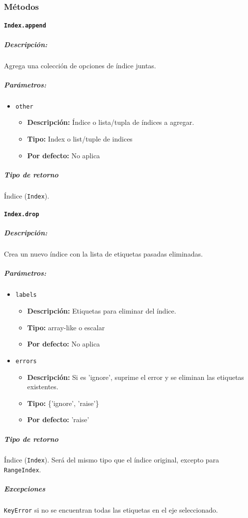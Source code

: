\subsubsection{Métodos}
\paragraph{\texttt{Index.append}}
\subparagraph{Descripción:}
Agrega una colección de opciones de índice juntas.
\subparagraph{Parámetros:}
\begin{itemize}
\item \texttt{other}
\begin{itemize}
\item \textbf{Descripción:} Índice o lista/tupla de índices a agregar.
\item \textbf{Tipo:} Index o list/tuple de indices
\item \textbf{Por defecto:} No aplica
\end{itemize}
\end{itemize}
\subparagraph{Tipo de retorno}
Índice (\texttt{Index}).
\paragraph{\texttt{Index.drop}}
\subparagraph{Descripción:}
Crea un nuevo índice con la lista de etiquetas pasadas eliminadas.
\subparagraph{Parámetros:}
\begin{itemize}
\item \texttt{labels}
\begin{itemize}
\item \textbf{Descripción:} Etiquetas para eliminar del índice.
\item \textbf{Tipo:} array-like o escalar
\item \textbf{Por defecto:} No aplica
\end{itemize}
\item \texttt{errors}
\begin{itemize}
\item \textbf{Descripción:} Si es 'ignore', suprime el error y se eliminan las etiquetas existentes.
\item \textbf{Tipo:} \{'ignore', 'raise'\}
\item \textbf{Por defecto:} 'raise'
\end{itemize}
\end{itemize}
\subparagraph{Tipo de retorno}
Índice (\texttt{Index}). Será del mismo tipo que el índice original, excepto para \texttt{RangeIndex}.
\subparagraph{Excepciones}
\texttt{KeyError} si no se encuentran todas las etiquetas en el eje seleccionado.
